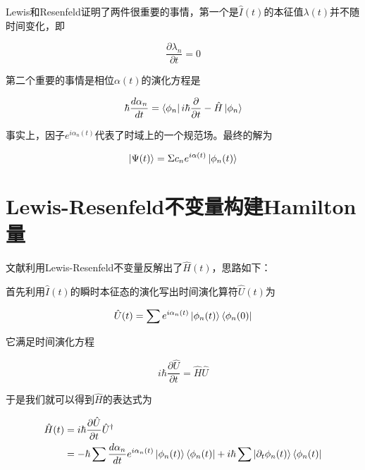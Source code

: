 \documentclass[a4paper]{article}
\begin{document}
        Lewis和Resenfeld证明了两件很重要的事情，第一个是$\hat{I}(t)$的本征值$\lambda(t)$并不随时间变化，即

        \begin{equation}
            \frac{\partial\lambda_n}{\partial t} = 0
        \end{equation}

        第二个重要的事情是相位$\alpha(t)$的演化方程是

        \begin{equation}
            \hbar\frac{d\alpha_n}{dt} = \bra{\phi_n}i\hbar\frac{\partial}{\partial t}-\hat{H}\ket{\phi_n} 
        \end{equation}

        事实上，因子$e^{i\alpha_n(t)}$代表了时域上的一个规范场。最终的解为

        \begin{equation}
            \ket{\Psi(t)} = \Sigma c_n e^{i\alpha(t)} \ket{\phi_n(t)}
        \end{equation}


    \section{Lewis-Resenfeld不变量构建Hamilton量}

        文献利用Lewis-Resenfeld不变量反解出了$\hat{H}(t)$，思路如下：

        首先利用$\hat{I}(t)$的瞬时本征态的演化写出时间演化算符$\hat{U}(t)$为

        \begin{equation}
            \hat{U}(t) = \sum e^{i\alpha_n(t)}\ket{\phi_n(t)}\bra{\phi_n(0)}
        \end{equation}

        它满足时间演化方程

        \begin{equation}
            i\hbar\frac{\partial\hat{U}}{\partial t} = \hat{H}\hat{U}
        \end{equation}

        于是我们就可以得到$\hat{H}$的表达式为

        \begin{equation}
            \begin{split}
                \hat{H}(t) &= i\hbar\frac{\partial\hat{U}}{\partial t}\hat{U}^\dagger \\
                    &= -\hbar\sum\frac{d\alpha_n}{dt}e^{i\alpha_n(t)}\ket{\phi_n(t)}\bra{\phi_n(t)} + i\hbar\sum\ket{\partial_t\phi_n(t)}\bra{\phi_n(t)}
            \end{split}
        \end{equation}
\end{document}
